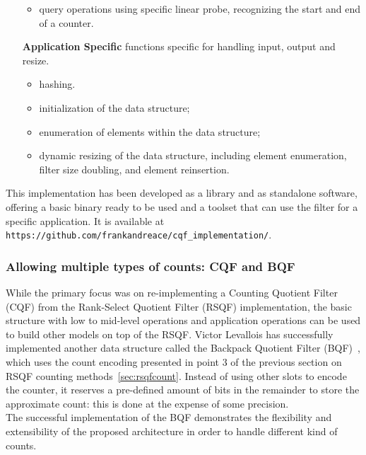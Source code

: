 \begin{itemize}[leftmargin=1.8cm]
\begin{itemize}
		\item query operations using specific linear probe, recognizing the start and end of a counter.
	\end{itemize}
	\item[\textbf{Application Specific}] functions specific for handling input, output and resize.
	\begin{itemize}
		\item \kmer hashing.
		\item initialization of the data structure;
		\item enumeration of elements within the data structure;
		\item dynamic resizing of the data structure, including element enumeration, filter size doubling, and element reinsertion.
	\end{itemize} 
\end{itemize}
This implementation has been developed as a library and as standalone software, offering a basic binary ready to be used and a toolset that can use the filter for a specific application. It is available at \texttt{https://github.com/frankandreace/cqf\_implementation/}.
\subsubsection{Allowing multiple types of counts: CQF and BQF}
While the primary focus was on re-implementing a Counting Quotient Filter (CQF) from the Rank-Select Quotient Filter (RSQF) implementation, the basic structure with low to mid-level operations and application operations can be used to build other models on top of the RSQF. Victor Levallois has successfully implemented another data structure called the Backpack Quotient Filter (\gls{BQF})~\cite{bqf}, which uses the count encoding presented in point 3 of the previous section on RSQF counting methods~\ref{sec:rsqfcount}. Instead of using other slots to encode the counter, it reserves a pre-defined amount of bits in the remainder to store the approximate count: this is done at the expense of some precision.\\
The successful implementation of the BQF demonstrates the flexibility and extensibility of the proposed architecture in order to handle different kind of counts.

